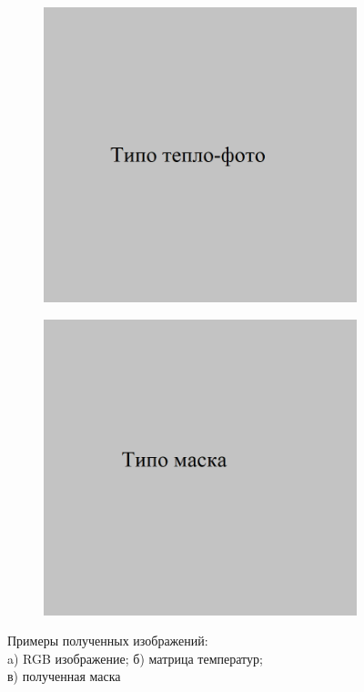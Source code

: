 \documentclass[t]{beamer}
\begin{document}
\begin{frame}
\begin{figure}[ht!]
\begin{subfigure}{.25\textwidth}
			\includegraphics[width = \textwidth]{image/tep_examp}
			\caption{}
		\end{subfigure}
		\begin{subfigure}{.25\textwidth}
			\centering
			\includegraphics[width = \textwidth]{image/mask}
			\caption{}
		\end{subfigure}
		\centering
		\vspace{-0.4cm}
		\caption{Примеры полученных изображений:\\ a) RGB изображение; б) матрица температур;\\ в) полученная маска}
		\label{fig:Examples}
	\end{figure}
	\end{frame}
\end{document}
